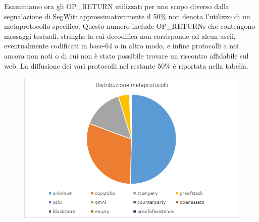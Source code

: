 Esaminiamo ora gli OP\_RETURN utilizzati per uno scopo diverso dalla segnalazione di SegWit: approssimativamente il 50\% non denota l’utilizzo di un metaprotocollo specifico. Questo numero include OP\_RETURNs che contengono messaggi testuali, stringhe la cui decodifica non corrisponde ad alcun ascii, eventualmente codificati in base-64 o in altro modo, e infine protocolli a noi ancora non noti o di cui non è stato possibile trovare un riscontro affidabile sul web.
La diffusione dei vari protocolli nel restante 50\% è riportata nella tabella.

\begin{figure}
	\centering
	\includegraphics[width=1.0\linewidth]{images/distribuzioneopreturn}
	\caption{}
	\label{fig:distribuzioneopreturn}
\end{figure}

